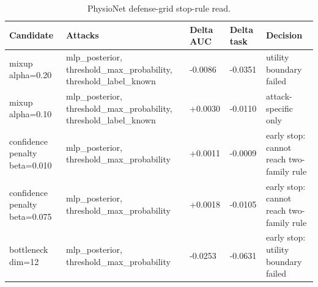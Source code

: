 \begin{table}[t]
\centering
\caption{PhysioNet defense-grid stop-rule read.}
\label{tab:physionet-defense-grid}
\begin{tabular}{lllll}
\toprule
Candidate & Attacks & Delta AUC & Delta task & Decision \\
\midrule
mixup alpha=0.20 & mlp\_posterior, threshold\_max\_probability, threshold\_label\_known & -0.0086 & -0.0351 & utility boundary failed \\
mixup alpha=0.10 & mlp\_posterior, threshold\_max\_probability, threshold\_label\_known & +0.0030 & -0.0110 & attack-specific only \\
confidence penalty beta=0.010 & mlp\_posterior, threshold\_max\_probability & +0.0011 & -0.0009 & early stop: cannot reach two-family rule \\
confidence penalty beta=0.075 & mlp\_posterior, threshold\_max\_probability & +0.0018 & -0.0105 & early stop: cannot reach two-family rule \\
bottleneck dim=12 & mlp\_posterior, threshold\_max\_probability & -0.0253 & -0.0631 & early stop: utility boundary failed \\
\bottomrule
\end{tabular}
\end{table}
